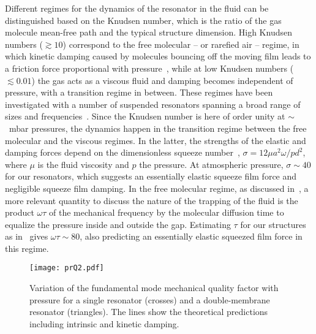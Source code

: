 \documentclass[pra,twocolumn,superscriptaddress,notitlepage]{revtex4-1}
\begin{document}
Different regimes for the dynamics of the resonator in the fluid can be distinguished based on the Knudsen number, which is the ratio of the gas molecule mean-free path and the typical structure dimension. High Knudsen numbers ($\gtrsim 10$) correspond to the free molecular -- or rarefied air -- regime, in which kinetic damping caused by molecules bouncing off the moving film leads to a friction force proportional with pressure~\cite{Christian1966}, while at low Knudsen numbers ($\lesssim 0.01$) the gas acts as a viscous fluid and damping becomes independent of pressure, with a transition regime in between. These regimes have been investigated with a number of suspended resonators spanning a broad range of sizes and frequencies~\cite{Prak1991,Blom1992,Legtenberg1994,Dohn2005,Vignola2006,Li2007,Verbridge2008,Khine2009, Svitelskiy2009,Ekinci2010}. 
Since the Knudsen number is here of order unity at $\sim$~mbar pressures, the dynamics happen in the transition regime between the free molecular and the viscous regimes. In the latter, the strengths of the elastic and damping forces depend on the dimensionless squeeze number~\cite{Blech1983}, $\sigma=12\mu a^2\omega/pd^2$, where $\mu$ is the fluid viscosity and $p$ the pressure. At atmospheric pressure, $\sigma\sim 40$ for our resonators, which suggests an essentially elastic squeeze film force and negligible squeeze film damping. In the free molecular regime, as discussed in~\cite{Suijlen2009,Ekinci2010}, a more relevant quantity to discuss the nature of the trapping of the fluid is the product $\omega\tau$ of the mechanical frequency by the molecular diffusion time to equalize the pressure inside and outside the gap. Estimating $\tau$ for our structures as in~\cite{Suijlen2009} gives $\omega\tau\sim 80$, also predicting an essentially elastic squeezed film force in this regime.

\begin{figure}
\texttt{[image: prQ2.pdf]}
\caption{Variation of the fundamental mode mechanical quality factor with pressure for a single resonator (crosses) and a double-membrane resonator (triangles). The lines show the theoretical predictions including intrinsic and kinetic damping.}
\label{fig2}
\end{figure}
\end{document}
